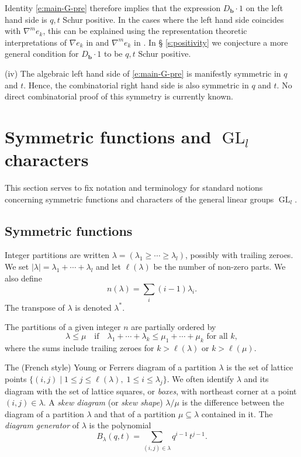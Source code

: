 \documentclass[12pt]{amsart}
\theoremstyle{definition}
\theoremstyle{remark}
\newcommand{\bb}{{\mathbf b}}
\DeclareMathOperator{\GL}{GL}
\begin{document}
Identity \eqref{e:main-G-pre} therefore implies that the expression
$D_{\bb }\cdot 1$ on the left hand side is $q,t$ Schur positive.  In
the cases where the left hand side coincides with $\nabla^{m} e_{k}$,
this can be explained using the representation theoretic
interpretations of $\nabla e_{k}$ in \cite{Haiman02} and $\nabla ^{m}
e_{k}$ in \cite[Proposition 6.1.1]{HaHaLoReUl05}.  In \S
\ref{s:positivity} we conjecture a more general condition for $D_{\bb
}\cdot 1$ to be $q,t$ Schur positive.

\smallskip

(iv) The algebraic left hand side of \eqref{e:main-G-pre} is
manifestly symmetric in $q$ and $t$.  Hence, the combinatorial right
hand side is also symmetric in $q$ and $t$.  No direct combinatorial
proof of this symmetry is currently known.

\section{Symmetric functions and \texorpdfstring{$\GL_{l}$}{GL\_l}
characters}
\label{s:symmetric}

This section serves to fix notation and terminology for standard
notions concerning symmetric functions and characters of the general
linear groups $\GL _{l}$.

\subsection{Symmetric functions}
\label{ss:symmetric}

Integer partitions are written $\lambda = (\lambda _{1}\geq \cdots
\geq \lambda _{l})$, possibly with trailing zeroes.  We set $|\lambda
| = \lambda _{1}+\cdots +\lambda _{l}$ and let $\ell(\lambda )$ be the
number of non-zero parts.
We also define
\begin{equation}\label{e:n-lambda}
n(\lambda ) = \sum _{i} (i-1)\lambda _{i}.
\end{equation}
The transpose of $\lambda $ is denoted $\lambda ^{*}$.

The partitions of a given integer $n$ are partially ordered by
\begin{equation}\label{e:dominance}
\lambda \leq \mu \quad \text{if}\quad 
\lambda _{1}+\cdots +\lambda _{k} \leq \mu _{1}+\cdots +\mu _{k}
\text{ for all $k$},
\end{equation}
where the sums include trailing zeroes for $k>\ell(\lambda )$ or
$k>\ell(\mu )$.

The (French style) Young
or Ferrers
diagram of a partition $\lambda $ is the set of lattice points
$\{(i,j)\mid 1\leq j\leq \ell(\lambda ),\; 1\leq i \leq \lambda _{j}
\}$.  We often identify $\lambda$ and its diagram with the set of
lattice squares, or {\em boxes}, with northeast corner at a point
$(i,j)\in \lambda$.
A {\em skew diagram} (or {\em skew shape}) $\lambda /\mu $ is
the difference between the diagram of a partition $\lambda $ and that
of a partition $\mu \subseteq \lambda $ contained in it.
The {\em diagram generator} of $\lambda $ is the polynomial
\begin{equation}\label{e:B-lambda}
B_{\lambda }(q,t) = \sum _{(i,j)\in \lambda} q^{i-1}\, t^{j-1}.
\end{equation}
\end{document}
